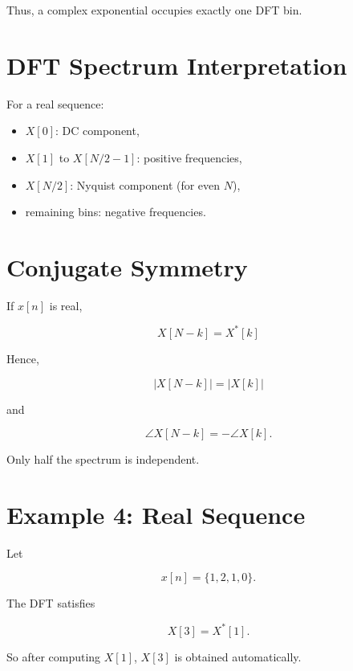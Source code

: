 Thus, a complex exponential occupies exactly one DFT bin.


\section{DFT Spectrum Interpretation}

For a real sequence:

\begin{itemize}
\item \(X[0]\): DC component,
\item \(X[1]\) to \(X[N/2-1]\): positive frequencies,
\item \(X[N/2]\): Nyquist component (for even \(N\)),
\item remaining bins: negative frequencies.
\end{itemize}


\section{Conjugate Symmetry}

If \(x[n]\) is real,

\[
\boxed{
X[N-k]=X^*[k]
}
\]

Hence,

\[
|X[N-k]|=|X[k]|
\]

and

\[
\angle X[N-k]=-\angle X[k].
\]

Only half the spectrum is independent.


\section{Example 4: Real Sequence}

Let

\[
x[n]=\{1,2,1,0\}.
\]

The DFT satisfies

\[
X[3]=X^*[1].
\]

So after computing \(X[1]\), \(X[3]\) is obtained automatically.


